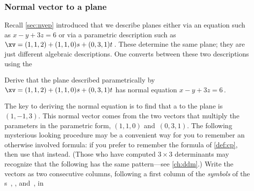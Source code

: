 




\subsubsection{Normal vector to a plane}
Recall \cref{sec:nvep} introduced that we describe planes either via an equation such as \(x-y+3z=6\) or via a parametric description such as \(\xv=(1,1,2)+(1,1,0)s+(0,3,1)t\)\,.
These determine the same plane; they are just different algebraic descriptions.
One converts between these two descriptions using the 




\begin{example} \label{eg:nviax}
Derive that the plane described parametrically by \(\xv=(1,1,2)+(1,1,0)s+(0,3,1)t\) has normal equation \(x-y+3z=6\)\,.
\begin{solution} 
The key to deriving the normal equation is to find that a  to the plane is~\((1,-1,3)\).
This normal vector comes from the two vectors that multiply the parameters in the parametric form, \((1,1,0)\) and~\((0,3,1)\).
The following mysterious looking procedure may be a convenient way for you to remember an otherwise involved formula: if you prefer to remember the formula of \cref{def:cp}, then use that instead.
(Those who have computed \(3\times3\) determinants may recognize that the following has the same pattern---see \cref{ch:ddm}.)
Write the vectors as two consecutive columns, following a first column of the \emph{symbols} of the s~\iv, \jv, and~\kv, in
\setlength{\unitlength}{1.2ex}
\def\abc#1{\begin{vmatrix}\begin{picture}(5.3,6)
\put(0,4){$\iv$}\put(2,4){$1$}\put(4,4){$0$}
\put(0,2){$\jv$}\put(2,2){$1$}\put(4,2){$3$}
\put(0,0){$\kv$}\put(2,0){$0$}\put(4,0){$1$}
\ifnum1=#1\put(0.5,-0.5){\line(0,1)6}\put(-0.5,4.5){\line(1,0)6}\fi
\ifnum2=#1\put(0.5,-0.5){\line(0,1)6}\put(-0.5,2.5){\line(1,0)6}\fi
\ifnum3=#1\put(0.5,-0.5){\line(0,1)6}\put(-0.5,0.5){\line(1,0)6}\fi
\end{picture}\end{vmatrix}}
\def\ab#1#2#3#4{\begin{vmatrix}\begin{picture}(3,4)
\put(0,2){$#1$}\put(2,2){$#2$}
\put(0,0){$#3$}\put(2,0){$#4$}
\color{red}\put(-0.5,-0.5){\line(1,1)4}

\end{picture}
\end{vmatrix}}
\end{solution}
\end{example}
